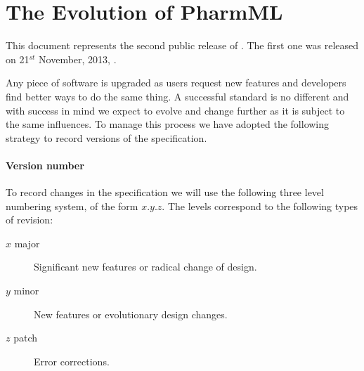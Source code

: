 

\section{The Evolution of PharmML}
	
This document represents the second public release of \pharmml. The first one was released  
on 21$^{st}$ November, 2013, \cite{Pharmml_021}.

Any piece of software is upgraded as users request new features and developers find better 
ways to do the same thing. A successful standard is no different and with success in mind we 
expect \pharmml to evolve and change further as it is subject to the same influences. To manage this 
process we have adopted the following strategy to record versions of the \pharmml specification.

\paragraph{Version number} 
\label{intro:versioning}

To record changes in the specification we will use the following three level numbering system, of the form
$x.y.z$. The levels correspond to the following types of revision:

\begin{description}
\item[$x$ major] Significant new features or radical change of design.
\item[$y$ minor] New features or evolutionary design changes.
\item[$z$ patch] Error corrections.
\end{description}


